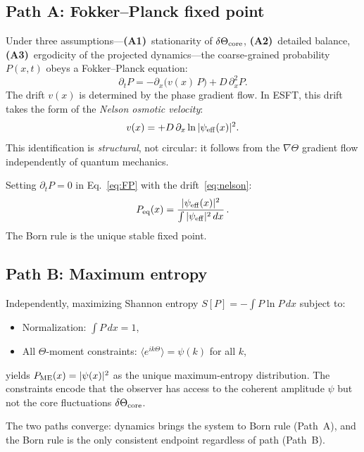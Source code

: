 ﻿\documentclass[a4paper,12pt]{article}
\newcommand{\vev}[1]{\langle #1 \rangle}
\begin{document}
\subsection{Path A: Fokker--Planck fixed point}

Under three assumptions---\textbf{(A1)}~stationarity of
$\delta\Theta_{\rm core}$, \textbf{(A2)}~detailed balance,
\textbf{(A3)}~ergodicity of the projected dynamics---the coarse-grained
probability $P(x,t)$ obeys a Fokker--Planck equation:
\begin{equation}
  \partial_t P = -\partial_x\big(v(x)\,P\big) + D\,\partial_x^2 P.
  \label{eq:FP}
\end{equation}
The drift $v(x)$ is determined by the phase gradient flow.  In ESFT,
this drift takes the form of the \emph{Nelson osmotic velocity}:
\begin{equation}
  v(x) = +D\,\partial_x\ln|\psi_{\rm eff}(x)|^2.
  \label{eq:nelson}
\end{equation}
This identification is \emph{structural}, not circular: it follows from
the $\nabla\Theta$ gradient flow independently of quantum mechanics.

Setting $\partial_t P=0$ in Eq.~\eqref{eq:FP} with the drift~\eqref{eq:nelson}:
\begin{equation}
  P_{\rm eq}(x) = \frac{|\psi_{\rm eff}(x)|^2}
    {\int|\psi_{\rm eff}|^2\,dx}\,.
  \label{eq:born_FP}
\end{equation}
The Born rule is the unique stable fixed point.

\subsection{Path B: Maximum entropy}

Independently, maximizing Shannon entropy $S[P]=-\int P\ln P\,dx$
subject to:
\begin{itemize}
  \item Normalization: $\int P\,dx=1$,
  \item All $\Theta$-moment constraints: $\vev{e^{ik\Theta}}=\psi(k)$ for all $k$,
\end{itemize}
yields $P_{\rm ME}(x)=|\psi(x)|^2$ as the unique maximum-entropy
distribution.  The constraints encode that the observer has access to
the coherent amplitude $\psi$ but not the core fluctuations
$\delta\Theta_{\rm core}$.

The two paths converge: dynamics brings the system to Born rule
(Path~A), and the Born rule is the only consistent endpoint regardless
of path (Path~B).
\end{document}
